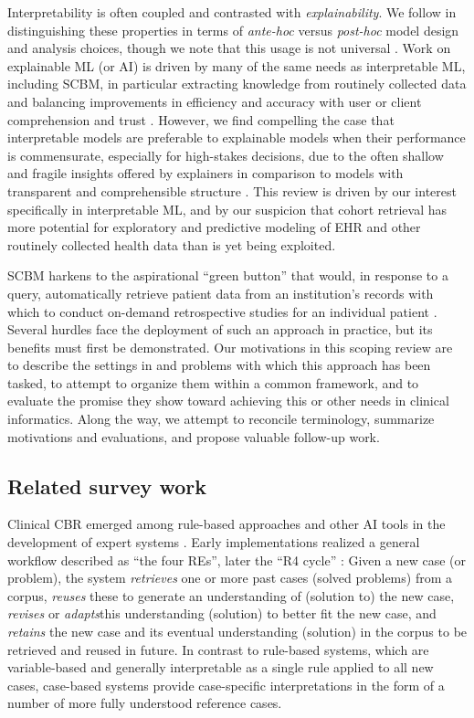 \documentclass[sn-mathphys,Numbered,pdflatex]{sn-jnl}
\theoremstyle{remark}
\theoremstyle{definition}
\newcommand{\hl}[1]{#1}
\begin{document}
\hl{Interpretability is often coupled and contrasted with \emph{explainability}.
We follow }\citet{Lisboa2023}\hl{ in distinguishing these properties in terms of \emph{ante-hoc} versus \emph{post-hoc} model design and analysis choices, though we note that this usage is not universal }\citep{Molnar2023}\hl{. Work on explainable ML (or AI) is driven by many of the same needs as interpretable ML, including SCBM, in particular extracting knowledge from routinely collected data and balancing improvements in efficiency and accuracy with user or client comprehension and trust }\citep{Lisboa2023}\hl{.
However, we find compelling the case that interpretable models are preferable to explainable models when their performance is commensurate, especially for high-stakes decisions, due to the often shallow and fragile insights offered by explainers in comparison to models with transparent and comprehensible structure }\citep{Rudin2022}\hl{.
This review is driven by our interest specifically in interpretable ML, and by our suspicion that cohort retrieval has more potential for exploratory and predictive modeling of EHR and other routinely collected health data than is yet being exploited.}

\hl{SCBM} harkens to the aspirational ``green button'' that would, in
response to a query, automatically retrieve patient data from an
institution's records with which to conduct on-demand retrospective
studies for an individual patient \citep{Longhurst2014}. Several hurdles
face the deployment of such an approach in practice, but its benefits
must first be demonstrated. Our motivations in this scoping review are
to describe the settings in and problems with which this approach has
been tasked, to attempt to organize them within a common framework, and
to evaluate the promise they show toward achieving this or other needs
in clinical informatics. Along the way, we attempt to reconcile
terminology, summarize motivations and evaluations, and propose valuable
follow-up work.

\subsection{\texorpdfstring{Related
\hl{survey }work}{Related work}}\label{related-work}

Clinical CBR emerged among rule-based approaches and other AI tools in
the development of expert systems \citep{Aamodt1994}. Early
implementations realized a general workflow described as ``the four
REs'', later the ``R4 cycle'' \citep{Aamodt1994, Begum2011}: Given a new
case (or problem), the system \emph{retrieves} one or more past cases
(solved problems) from a corpus, \emph{reuses} these to generate an
understanding of (solution to) the new case, \emph{revises}
\hl{or \emph{adapts}}this understanding (solution) to better fit the new
\hl{case,} and \emph{retains} the new case and its eventual
understanding (solution) in the corpus to be retrieved and reused in
future. In contrast to rule-based systems, which are variable-based and
generally interpretable as a single rule applied to all new cases,
case-based systems provide case-specific interpretations in the form of
a number of more fully understood reference cases.
\end{document}
